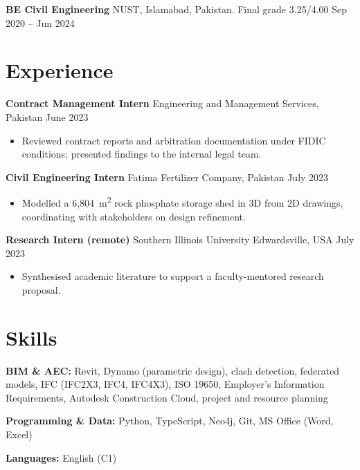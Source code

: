 \documentclass[a4paper,10.5pt]{article}
\newcommand{\datefill}{\dotfill}
\newcommand{\entry}[3]{\vspace{2.5pt}\noindent\textbf{#1} \textbar{} #2 \datefill{} #3\par\vspace{0.5pt}}
\newcommand{\skillrow}[2]{\noindent\textbf{#1:} #2\par\vspace{1pt}}
\begin{document}
\entry{BE Civil Engineering}{NUST, Islamabad, Pakistan. Final grade 3.25/4.00}{Sep 2020 -- Jun 2024}

\section{Experience}
\entry{Contract Management Intern}{Engineering and Management Services, Pakistan}{June 2023}
\begin{itemize}
  \item Reviewed contract reports and arbitration documentation under FIDIC
        conditions; presented findings to the internal legal team.
\end{itemize}

\entry{Civil Engineering Intern}{Fatima Fertilizer Company, Pakistan}{July 2023}
\begin{itemize}
  \item Modelled a 6,804~m\textsuperscript{2} rock phosphate storage shed in 3D from
        2D drawings, coordinating with stakeholders on design refinement.
\end{itemize}

\entry{Research Intern (remote)}{Southern Illinois University Edwardsville, USA}{July 2023}
\begin{itemize}
  \item Synthesised academic literature to support a faculty-mentored research proposal.
\end{itemize}

\section{Skills}

\skillrow{BIM \& AEC}{Revit, Dynamo (parametric design), clash detection, federated models, IFC (IFC2X3, IFC4, IFC4X3), ISO 19650, Employer's Information Requirements, Autodesk Construction Cloud, project and resource planning}
\skillrow{Programming \& Data}{Python, TypeScript, Neo4j, Git, MS Office (Word, Excel)}

\skillrow{Languages}{English (C1)}
\end{document}
